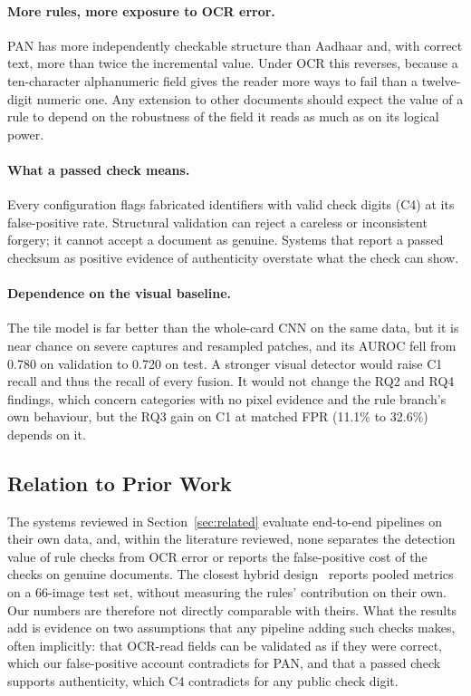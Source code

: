 \documentclass[conference]{IEEEtran}
\begin{document}
\paragraph*{More rules, more exposure to OCR error.} PAN has
more independently checkable structure than Aadhaar and, with correct
text, more than twice the incremental value. Under OCR this reverses,
because a ten-character alphanumeric field gives the reader more ways to
fail than a twelve-digit numeric one. Any extension to other documents
should expect the value of a rule to depend on the robustness of the
field it reads as much as on its logical power.

\paragraph*{What a passed check means.} Every
configuration flags fabricated identifiers with valid check digits (C4)
at its false-positive rate. Structural validation can reject a careless
or inconsistent forgery; it cannot accept a document as genuine. Systems
that report a passed checksum as positive evidence of authenticity
overstate what the check can show.

\paragraph*{Dependence on the visual baseline.} The tile model is far better than the whole-card CNN on
the same data, but it is near chance on severe captures and resampled
patches, and its AUROC fell from 0.780 on validation to 0.720 on test.
A stronger visual detector would raise C1 recall and thus the recall
of every fusion. It would not change the RQ2 and RQ4 findings, which
concern categories with no pixel evidence and the rule branch's own
behaviour, but the RQ3 gain on C1 at matched FPR (11.1\% to 32.6\%)
depends on it.

\subsection{Relation to Prior Work}
\label{subsec:priorwork}

The systems reviewed in Section~\ref{sec:related} evaluate end-to-end
pipelines on their own data, and, within the literature reviewed, none
separates the detection value of rule checks from OCR error or reports
the false-positive cost of the checks on genuine documents. The closest
hybrid design~\cite{limconnie} reports pooled metrics on a 66-image
test set, without measuring the rules' contribution on their own. Our
numbers are therefore not directly comparable with theirs. What the results add
is evidence on two assumptions that any pipeline adding such checks
makes, often implicitly: that OCR-read fields can be validated as if
they were correct, which our false-positive account contradicts for
PAN, and that a passed check supports authenticity, which C4
contradicts for any public check digit.
\end{document}
